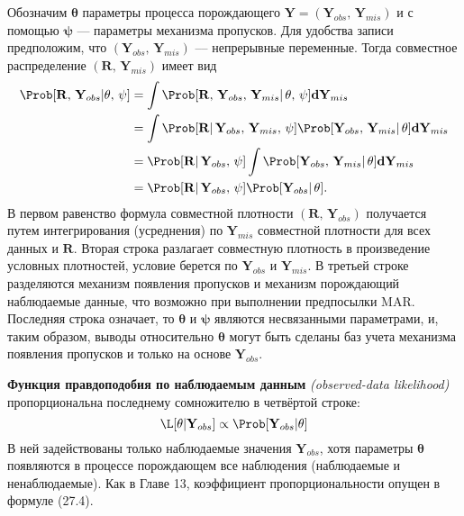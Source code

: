 Обозначим $\mathbf{\theta}$ параметры процесса порождающего $\mathbf{Y}=(\mathbf{Y}_{obs}, \, \mathbf{Y}_{mis})$ и с помощью $\mathbf{\psi}$ --- параметры механизма пропусков. Для удобства записи предположим, что $(\mathbf{Y}_{obs}, \, \mathbf{Y}_{mis})$ --– непрерывные переменные. Тогда совместное распределение $(\mathbf{R}, \, \mathbf{Y}_{mis})$ имеет вид 
\begin{align}
\Prob[\mathbf{R}, \, \mathbf{Y}_{obs} | \mathbf{\theta}, \, \mathbf{\psi}] &= \int \Prob[\mathbf{R}, \, \mathbf{Y}_{obs}, \, \mathbf{Y}_{mis}| \, \mathbf{\theta}, \, \mathbf{\psi}]\mathbf{dY}_{mis} \\
&= \int \Prob[\mathbf{R}| \, \mathbf{Y}_{obs}, \, \mathbf{Y}_{mis}, \, \mathbf{\psi}] \Prob[\mathbf{Y}_{obs}, \, \mathbf{Y}_{mis}| \, \mathbf{\theta}]\mathbf{dY}_{mis} \notag \\
&= \Prob[\mathbf{R}| \, \mathbf{Y}_{obs}, \, \mathbf{\psi}] \int \Prob [\mathbf{Y}_{obs}, \, \mathbf{Y}_{mis}| \, \mathbf{\theta}]\mathbf{dY}_{mis} \notag \\
&=\Prob[\mathbf{R}| \, \mathbf{Y}_{obs}, \, \mathbf{\psi}] \Prob[\mathbf{Y}_{obs}| \, \mathbf{\theta}]. \notag
\end{align}
В первом равенство  формула совместной плотности $(\mathbf{R}, \, \mathbf{Y}_{obs})$ получается путем интегрирования (усреднения) по $\mathbf{Y}_{mis}$ совместной плотности для всех данных и $\mathbf{R}$. Вторая строка разлагает совместную плотность в произведение условных плотностей, условие берется по $\mathbf{Y}_{obs}$ и $\mathbf{Y}_{mis}$. В третьей строке разделяются механизм появления пропусков и механизм порождающий наблюдаемые данные, что возможно при выполнении предпосылки MAR. Последняя строка означает, то $\mathbf{\theta}$ и $\mathbf{\psi}$ являются несвязанными параметрами, и, таким образом, выводы относительно $\mathbf{\theta}$ могут быть сделаны баз учета механизма появления пропусков и только на основе $\mathbf{Y}_{obs}$. 

{\bf Функция правдоподобия по наблюдаемым данным} \emph{(observed-data likelihood)} пропорциональна последнему сомножителю в четвёртой строке:
\begin{equation}
\L[\mathbf{\theta}|\mathbf{Y}_{obs}] \propto \Prob[\mathbf{Y}_{obs}|\mathbf{\theta}]
\end{equation}
В ней задействованы только наблюдаемые значения $\mathbf{Y}_{obs}$, хотя параметры $\mathbf{\theta}$ появляются в процессе порождающем  все наблюдения (наблюдаемые и ненаблюдаемые). Как в Главе 13, коэффициент пропорциональности опущен в формуле (27.4).

